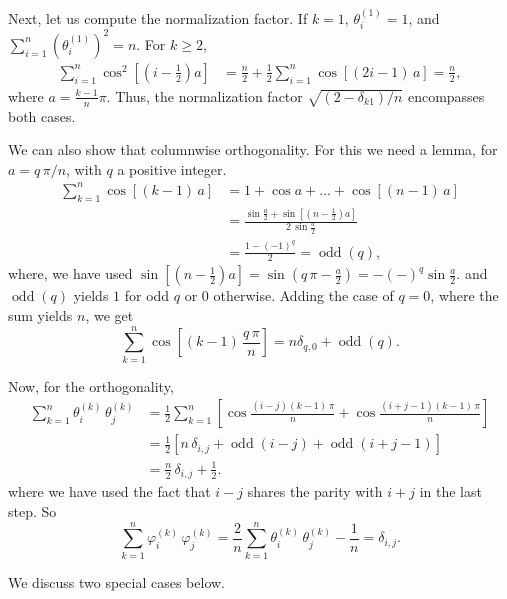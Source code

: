\documentclass[reprint]{revtex4-1}
\begin{document}
{Next, let us compute the normalization factor.
%
If $k = 1$, $\theta^{(1)}_i = 1$, and
$
\sum_{i = 1}^n \left( \theta^{(1)}_i \right)^2 = n.
$
For $k \ge 2$,
$$
\begin{aligned}
  \sum_{i = 1}^n \cos^2 \left[\left(i - \frac1 2 \right) a\right]
  &=
  \frac n 2
  +
  \frac 1 2
  \sum_{i = 1}^n \cos\left[(2 i - 1)\, a \right]
  =
  \frac n 2,
\end{aligned}
$$
where $a = \frac{k-1}{n} \pi$.
Thus, the normalization factor $\sqrt{(2 - \delta_{k1})/n}$
encompasses both cases.

We can also show that columnwise orthogonality.
%
For this we need a lemma, for $a = q \, \pi/n$,
with $q$ a positive integer.
$$
\begin{aligned}
\sum_{k = 1}^n \cos[(k - 1) \, a]
&=
1 + \cos a + \dots + \cos[(n - 1) \, a]
\\
&=
\frac{
      \sin\frac a 2
    + \sin \left[ \left( n - \frac 1 2 \right) a \right]
    }
    {
      2 \, \sin \frac a 2
    }
\\
&=
\frac{ 1 - (-1)^q } { 2 }
= \operatorname{odd}(q),
\end{aligned}
$$
%
where, we have used
$\sin \left[ \left( n - \frac 1 2 \right) a \right]
= \sin \left( q \, \pi - \frac a 2 \right)
= -(-)^q\sin\frac a 2.$
%
and $\operatorname{odd}(q)$
yields $1$ for odd $q$ or $0$ otherwise.
%
Adding the case of $q = 0$, where the sum yields $n$,
we get
$$
\sum_{k = 1}^n \cos\left[(k - 1) \, \frac { q \, \pi } { n }  \right]
= n \delta_{q, 0} + \operatorname{odd}(q).
$$


Now, for the orthogonality,
$$
\begin{aligned}
  \sum_{k = 1}^n
  \theta^{(k)}_i \, \theta^{(k)}_j
  &=
  \frac 1 2
  \sum_{k = 1}^n
  \left[
    \cos \tfrac{ (i - j) (k - 1) \, \pi }
               {         n              }
    +
    \cos \tfrac{ (i + j - 1) (k - 1) \, \pi }
               {             n              }
  \right]
  \\
  &=
  \frac 1 2
  \left[
    n \, \delta_{i, j}
    +
    \operatorname{odd}(i - j)
    +
    \operatorname{odd}(i + j - 1)
  \right]
  \\
  &=
  \frac n 2 \, \delta_{i, j}
  + \frac 1 2.
\end{aligned}
$$
where we have used the fact
that $i - j$ shares the parity with $i + j$
in the last step.
%
So
$$
  \sum_{k = 1}^n
  \varphi^{(k)}_i \, \varphi^{(k)}_j
  =
  \frac 2 n
  \sum_{k = 1}^n
  \theta^{(k)}_i \, \theta^{(k)}_j
  -
  \frac 1 n
  =
  \delta_{i, j}.
$$
}
%
We discuss two special cases below.
\end{document}
